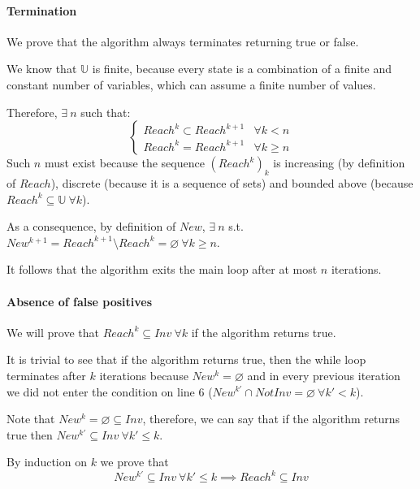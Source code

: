 \documentclass[12pt]{article}
\begin{document}
    \paragraph{Termination}
    We prove that the algorithm always terminates returning true or false.
   
    \noindent
    We know that $\mathbb U$ is finite, because every state is a combination of a finite and constant number of variables, which can assume a finite number of values.

    \noindent
    Therefore, $\exists\ n$ such that:
    $$
    \begin{cases}
          Reach^k \subset Reach^{k+1} & \forall k < n \\
          Reach^k = Reach^{k+1} & \forall k \geq n
    \end{cases}
    $$
    Such $n$ must exist because the sequence $(Reach^k)_k$ is increasing (by definition of $Reach$), discrete (because it is a sequence of sets) and bounded above (because $Reach^k \subseteq \mathbb U\ \forall k$).

    \noindent
    As a consequence, by definition of $New$, $\exists\ n$ s.t. $New^{k+1} = Reach^{k+1} \setminus Reach^k = \varnothing\ \forall k \geq n$.

    \noindent
    It follows that the algorithm exits the main loop after at most $n$ iterations.

    \paragraph{Absence of false positives}
    We will prove that $Reach^k \subseteq Inv\ \forall k$ if the algorithm returns true.

    \noindent
    It is trivial to see that if the algorithm returns true, then the while loop terminates after $k$ iterations because $New^k = \varnothing$ and in every previous iteration we did not enter the condition on line 6 ($New^{k'} \cap NotInv = \varnothing\ \forall k' < k$).

    \noindent
    Note that $New^k = \varnothing \subseteq Inv$, therefore, we can say that if the algorithm returns true then $New^{k'} \subseteq Inv\ \forall k' \leq k$.

    \noindent
    By induction on $k$ we prove that
    \begin{equation}\label{th:true:tesi}
        New^{k'} \subseteq Inv\ \forall k' \leq k \implies Reach^k \subseteq Inv
    \end{equation}
    
\end{document}
